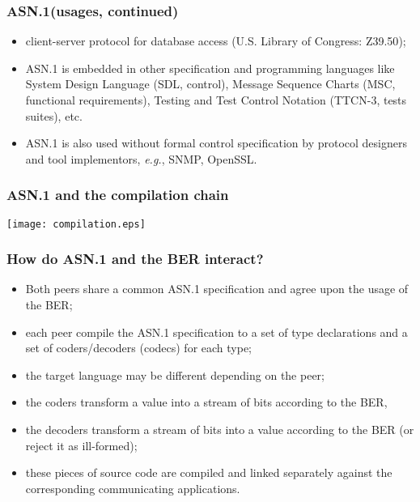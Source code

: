 \documentclass[compress,dvips,xcolor={dvipsnames},t]{beamer}
\newcommand\ASN{\textsf{ASN.1}\xspace}
\begin{document}
\begin{frame}
\frametitle{\ASN (usages, continued)}

  \begin{itemize}

  \item client-server protocol for database access (U.S. Library of
    Congress: \textsf{Z39.50});

  \item \ASN is embedded in other specification and programming
    languages like System Design Language (SDL, control), Message
    Sequence Charts (MSC, functional requirements), Testing and Test
    Control Notation (TTCN-3, tests suites), etc.

  \item \ASN is also used without formal control specification by
    protocol designers and tool implementors, \emph{e.g.}, SNMP,
    OpenSSL.

\end{itemize}

\end{frame}

\begin{frame}
\frametitle{\ASN and the compilation chain}

\begin{center}
\texttt{[image: compilation.eps]}
\end{center}

\end{frame}

\begin{frame}
\frametitle{How do \ASN and the BER interact?}

\begin{itemize}

  \item Both peers share a common \ASN specification and agree upon
    the usage of the BER;

  \item each peer compile the \ASN specification to a set of type
    declarations and a set of coders/decoders (codecs) for each type;

  \item the target language may be different depending on the peer;

  \item the coders transform a value into a stream of bits according
    to the BER,

  \item the decoders transform a stream of bits into a value according
    to the BER (or reject it as ill-formed);

  \item these pieces of source code are compiled and linked separately
    against the corresponding communicating applications.

\end{itemize}

\end{frame}
\end{document}
